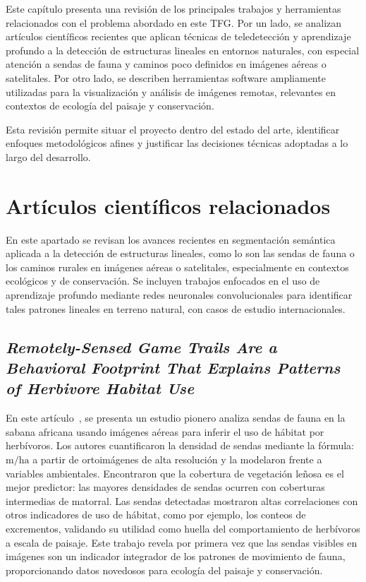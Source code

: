 
Este capítulo presenta una revisión de los principales trabajos y herramientas relacionados con el problema abordado en este TFG. Por un lado, se analizan artículos científicos recientes que aplican técnicas de teledetección y aprendizaje profundo a la detección de estructuras lineales en entornos naturales, con especial atención a sendas de fauna y caminos poco definidos en imágenes aéreas o satelitales. Por otro lado, se describen herramientas software ampliamente utilizadas para la visualización y análisis de imágenes remotas, relevantes en contextos de ecología del paisaje y conservación. 

Esta revisión permite situar el proyecto dentro del estado del arte, identificar enfoques metodológicos afines y justificar las decisiones técnicas adoptadas a lo largo del desarrollo.

\section{Artículos científicos relacionados}

En este apartado se revisan los avances recientes en segmentación semántica aplicada a la detección de estructuras lineales, como lo son las sendas de fauna o los caminos rurales en imágenes aéreas o satelitales, especialmente en contextos ecológicos y de conservación. Se incluyen trabajos enfocados en el uso de aprendizaje profundo mediante redes neuronales convolucionales para identificar tales patrones lineales en terreno natural, con casos de estudio internacionales.

\subsection { \textit{ Remotely-Sensed Game Trails Are a Behavioral Footprint That Explains Patterns of Herbivore Habitat Use}}

En este artículo~\cite{Stears2025}, se presenta un estudio pionero analiza sendas de fauna en la sabana africana usando imágenes aéreas para inferir el uso de hábitat por herbívoros. Los autores cuantificaron la densidad de sendas mediante la fórmula: $\mathrm{m/ha}$ a partir de ortoimágenes de alta resolución y la modelaron frente a variables ambientales. Encontraron que la cobertura de vegetación leñosa es el mejor predictor: las mayores densidades de sendas ocurren con coberturas intermedias de matorral. Las sendas detectadas mostraron altas correlaciones con otros indicadores de uso de hábitat, como por ejemplo, los conteos de excrementos, validando su utilidad como huella del comportamiento de herbívoros a escala de paisaje. Este trabajo revela por primera vez que las sendas visibles en imágenes son un indicador integrador de los patrones de movimiento de fauna, proporcionando datos novedosos para ecología del paisaje y conservación.

